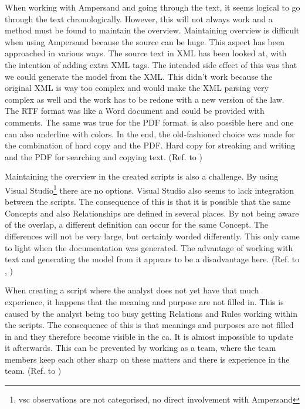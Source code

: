 When working with Ampersand and going through the text, it seems logical to go through the text chronologically.
However, this will not always work and a method must be found to maintain the overview.
Maintaining overview is difficult when using Ampersand because the source can be huge.
This aspect has been approached in various ways.
The source text in XML has been looked at, with the intention of adding extra XML tags.
The intended side effect of this was that we could generate the model from the XML.
This didn't work because the original XML is way too complex and would make the XML parsing very complex as well and the work has to be redone with a new version of the law.
The RTF format was like a Word document and could be provided with comments.
The same was true for the PDF format.
 is also possible here and one can also underline with colors.
In the end, the old-fashioned choice was made for the combination of hard copy and the PDF.
Hard copy for streaking and writing and the PDF for searching and copying text.
(Ref. to )



Maintaining the overview in the created scripts is also a challenge.
By using Visual Studio\footnote{\acrlong{vsc} observations are not categorised, no direct involvement with Ampersand}  there are no  options.
Visual Studio also seems to lack integration between the scripts.
The consequence of this is that it is possible that the same Concepts and also Relationships are defined in several places.
By not being aware of the overlap, a different definition can occur for the same Concept.
The differences will not be very large, but certainly worded differently.
This only came to light when the documentation was generated.
The advantage of working with text and generating the model from it appears to be a disadvantage here.
(Ref. to , )

When creating a script where the analyst does not yet have that much experience, it happens that the meaning and purpose are not filled in.
This is caused by the analyst being too busy getting Relations and Rules working within the scripts.
The consequence of this is that meanings and purposes are not filled in and they therefore become visible in the \acrshort{ca}.
It is almost impossible to update it afterwards.
This can be prevented by working as a team, where the team members keep each other sharp on these matters and there is experience in the team.
(Ref. to )


